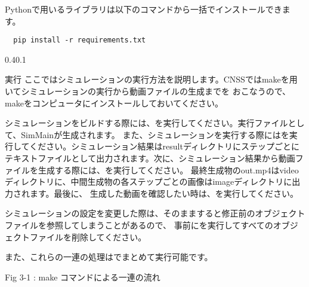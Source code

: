 \documentclass[vipdfmx,a4paper,11pt]{jsarticle}
\makeatletter
\renewcommand{\section}{%
  \@startsection{section}{1}{\z@}%
  {0.4\Cvs}{0.1\Cvs}%
  {\normalfont\large\headfont\raggedright}}
\makeatother
\begin{document}
Pythonで用いるライブラリは以下のコマンドから一括でインストールできます。

\begin{lstlisting}
  pip install -r requirements.txt
\end{lstlisting}

\section{実行}
ここではシミュレーションの実行方法を説明します。CNSSではmakeを用いてシミュレーションの実行から動画ファイルの生成までを
おこなうので、makeをコンピュータにインストールしておいてください。

シミュレーションをビルドする際には、を実行してください。実行ファイルとして、SimMainが生成されます。
また、シミュレーションを実行する際にはを実行してください。シミュレーション結果はresultディレクトリにステップごとに
テキストファイルとして出力されます。次に、シミュレーション結果から動画ファイルを生成する際には、を実行してください。
最終生成物のout.mp4はvideoディレクトリに、中間生成物の各ステップごとの画像はimageディレクトリに出力されます。最後に、
生成した動画を確認したい時は、を実行してください。

シミュレーションの設定を変更した際は、そのまますると修正前のオブジェクトファイルを参照してしまうことがあるので、
事前にを実行してすべてのオブジェクトファイルを削除してください。

また、これらの一連の処理はでまとめて実行可能です。

\begin{center}

  Fig 3-1 : make コマンドによる一連の流れ
\end{center}
\end{document}
